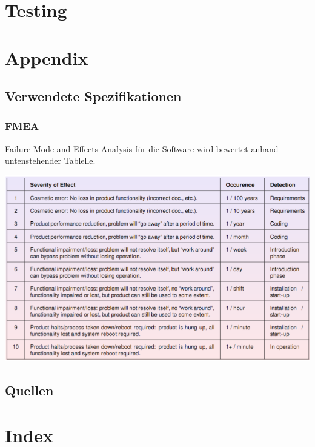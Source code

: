 \documentclass[a4paper]{scrreprt}
\begin{document}
\chapter{Testing}



\chapter{Appendix}

\section{Verwendete Spezifikationen}
\subsection{FMEA}
Failure Mode and Effects Analysis für die Software wird bewertet anhand untenstehender Tablelle.

\includegraphics[width=1\textwidth]{img/fmea.png}



\section{Quellen}





\chapter{Index}
\end{document}
